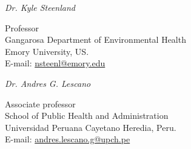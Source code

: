 \documentclass[10pt]{article}
\newenvironment{innerlist}[1][\enskip$\circ$]%
{\begin{compactitem}[#1]}{\end{compactitem}}
\begin{document}
\vspace{0.05in}
\textit{Dr. Kyle Steenland}
\begin{innerlist}
	\item[] Professor \\
	Gangarosa Department of Environmental Health\\
	Emory University, US.		\\
	E-mail: \href{mailto:nsteenl@emory.edu}{nsteenl@emory.edu}
\end{innerlist}

\vspace{0.05in}
\textit{Dr. Andres G. Lescano}
\begin{innerlist}
	\item[] Associate professor \\
	School of Public Health and Administration\\
	Universidad Peruana Cayetano Heredia, Peru.		\\
	E-mail: \href{mailto:andres.lescano.g@upch.pe}{andres.lescano.g@upch.pe}
\end{innerlist}

	
\end{document}
